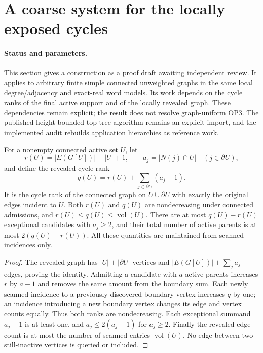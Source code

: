 \section[Locally exposed cycle rank]{A coarse system for the locally exposed cycles}
\label{sec:op3-local-cycle-rank}

\paragraph{Status and parameters.}
This section gives a \statusproved{} construction as a proof draft awaiting
independent review. It applies to arbitrary finite simple connected
unweighted graphs in the same local degree/adjacency and exact-real word
models. Its work depends on the cycle ranks of the final active support
and of the locally revealed graph. These dependencies remain explicit;
the result does not resolve graph-uniform OP3. The published height-bounded
top-tree algorithm remains an explicit \statussource{} import, and the
implemented audit rebuilds application hierarchies as reference work.

\begin{lemma}
\label{lem:op3-revealed-cycle-rank}
For a nonempty connected active set $U$, let
\[
 r(U)=|E(G[U])|-|U|+1,\qquad
 a_j=|N(j)\cap U|\quad(j\in\partial U),
\]
and define the revealed cycle rank
\begin{equation}
 q(U)=r(U)+\sum_{j\in\partial U}(a_j-1).
 \label{eq:op3-revealed-cycle-rank}
\end{equation}
It is the cycle rank of the connected graph on $U\cup\partial U$ with
exactly the original edges incident to $U$. Both $r(U)$ and $q(U)$ are
nondecreasing under connected admissions, and
$r(U)\leq q(U)\leq\operatorname{vol}(U)$.
There are at most $q(U)-r(U)$ exceptional candidates with $a_j\geq2$,
and their total number of active parents is at most $2(q(U)-r(U))$.
All these quantities are maintained from scanned incidences only.
\end{lemma}
\begin{proof}
The revealed graph has $|U|+|\partial U|$ vertices and
$|E(G[U])|+\sum_j a_j$ edges, proving the identity. Admitting a candidate
with $a$ active parents increases $r$ by $a-1$ and removes the same amount
from the boundary sum. Each newly scanned incidence to a previously
discovered boundary vertex increases $q$ by one; an incidence introducing
a new boundary vertex changes its edge and vertex counts equally.
Thus both ranks are nondecreasing. Each exceptional summand $a_j-1$ is
at least one, and $a_j\leq2(a_j-1)$ for $a_j\geq2$. Finally the revealed
edge count is at most the number of scanned entries $\operatorname{vol}(U)$.
No edge between two still-inactive vertices is queried or included.
\end{proof}

